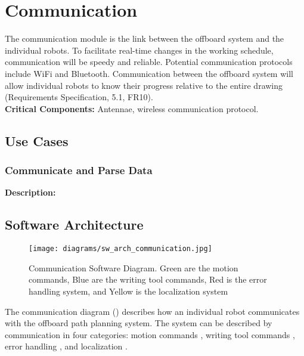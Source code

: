 
\section{Communication}
\label{sec:communication}
The communication module is the link between the offboard system and the individual robots. To facilitate real-time changes in the working schedule, communication will be speedy and reliable. Potential communication protocols include WiFi and Bluetooth. Communication between the offboard system will allow individual robots to know their progress relative to the entire drawing (Requirements Specification, 5.1, FR10). \\

\noindent
\textbf{Critical Components:} Antennae, wireless communication protocol. 

\subsection{Use Cases}
\subsubsection{Communicate and Parse Data}
\textbf{Description:} 


\subsection{Software Architecture}
\label{sec:sw_arch_communication}

\begin{figure}[h!]
 \centering
  \texttt{[image: diagrams/sw\_arch\_communication.jpg]}
	\caption{Communication Software Diagram. Green are the motion commands, Blue are the writing tool commands, Red is the error handling system, and Yellow is the localization system}
 \label{fig:comm_processing}
\end{figure}

The communication diagram () describes how an individual robot communicates with the offboard path planning system. The system can be described by communication in four categories: motion commands , writing tool commands , error handling , and localization .

